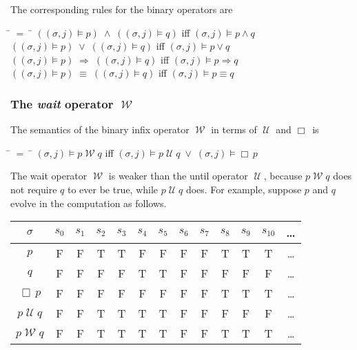 \documentclass[fleqn, leqno]{article}
\newcommand{\mymathindent}{24pt}                    %
\newcommand{\impl}{\ensuremath{\Rightarrow}}        %
\newcommand{\Until}{\;\mathcal{U}\;}
\newcommand{\Wait}{\;\mathcal{W}\;}
\newcommand{\Always}{\Box\,}
\begin{document}
The corresponding rules for the binary operators are

\begin{tabbing}
\hspace{\mymathindent} \= $= \;$ \= \kill
  \> $((\sigma, j) \models p) \;\land\; ((\sigma, j) \models q)$ \quad iff \quad $(\sigma, j) \models p\land q$\\
  \> $((\sigma, j) \models p) \;\lor\; ((\sigma, j) \models q)$ \quad iff \quad $(\sigma, j) \models p\lor q$\\
  \> $((\sigma, j) \models p) \;\impl\; ((\sigma, j) \models q)$ \quad iff \quad $(\sigma, j) \models p \impl q$\\
  \> $((\sigma, j) \models p) \;\equiv\; ((\sigma, j) \models q)$ \quad iff \quad $(\sigma, j) \models p \equiv q$
\end{tabbing}

\subsubsection*{The \textit{wait} operator $\Wait$}

The semantics of the binary infix operator $\Wait$ in terms of $\Until$ and $\Always$ is

\begin{tabbing}
\hspace{\mymathindent} \= $= \;$ \= \kill
  \> $(\sigma, j) \models p \Wait q$ \quad iff \quad $(\sigma, j) \models p \Until q \; \lor \; (\sigma, j) \models \Always p$
\end{tabbing}

The wait operator $\Wait$ is weaker than the until operator $\Until$, because $p\Wait q$ does not require $q$ to ever be true,
while $p\Until q$ does.
For example, suppose $p$ and $q$ evolve in the computation as follows.\\

\begin{tabular}{c|cccccccccccc}
  $\sigma$       & $s_0$ & $s_1$ & $s_2$ & $s_3$ & $s_4$ & $s_5$ & $s_6$ & $s_7$ & $s_8$& $s_9$  & $s_{10}$&  \dots \\
  \hline
  $p$            & F     & F     & T     & T     & F     & F     & F     & F     & T     & T     & T     &  \dots\\
  $q$            & F     & F     & F     & F     & T     & T     & F     & F     & F     & F     & F     &  \dots\\
  $\Always p$    & F     & F     & F     & F     & F     & F     & F     & F     & T     & T     & T     &  \dots\\
  $p\Until q$    & F     & F     & T     & T     & T     & T     & F     & F     & F     & F     & F     &  \dots\\
  $p\Wait q$     & F     & F     & T     & T     & T     & T     & F     & F     & T     & T     & T     &  \dots\\
\end{tabular}\\
\end{document}
